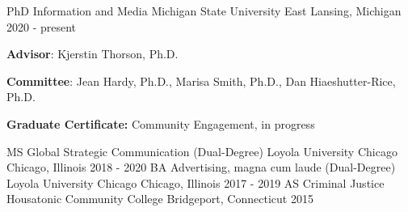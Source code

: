 \begin{cventries}
  \cventry
    {PhD Information and Media} %
    {Michigan State University} %
    {East Lansing, Michigan} %
    {2020 - present} %
    {
      \begin{cvitems} %
              \item [] {\textbf{Advisor}: Kjerstin Thorson, Ph.D.}
              \item[] {\textbf{Committee}: Jean Hardy, Ph.D., Marisa Smith, Ph.D., Dan Hiaeshutter-Rice, Ph.D. }
                \item[] {\textbf{Graduate Certificate:} Community Engagement, in progress}
      \end{cvitems}
    }
  \cventry
    {MS Global Strategic Communication (Dual-Degree)} %
    {Loyola University Chicago} %
    {Chicago, Illinois} %
    {2018 - 2020} %
    {
    }
\cventry
    {BA Advertising, magna cum laude (Dual-Degree)} %
    {Loyola University Chicago} %
    {Chicago, Illinois} %
    {2017 - 2019} %
    {
    }
  \cventry
    {AS Criminal Justice} %
    {Housatonic Community College} %
    {Bridgeport, Connecticut} %
    {2015} %
{
    }
\end{cventries}

